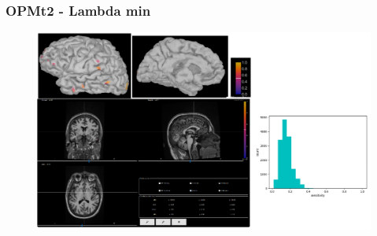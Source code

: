 \documentclass{beamer}
\numberwithin{figure}{section}
\numberwithin{equation}{section}
\begin{document}
\section{}
\begin{frame}
 \frametitle{OPMt2 - Lambda min}
	\begin{figure}[p]
  		\centering
  		\includegraphics[width=1\linewidth]{pictures/opmt222}
  		\label{fig:approaches_RDF}
 	\end{figure}

  
\end{frame}



\ThankYouFrame

\end{document}

